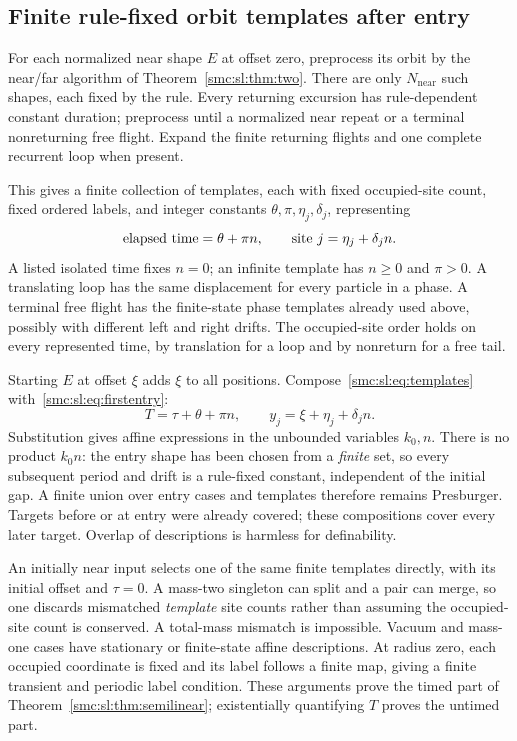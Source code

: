 \documentclass[11pt,letterpaper]{article}
\numberwithin{equation}{section}
\theoremstyle{definition}
\theoremstyle{remark}
\begin{document}
\subsection{Finite rule-fixed orbit templates after entry}
For each normalized near shape $E$ at offset zero, preprocess its orbit by the near/far algorithm of Theorem~\ref{smc:sl:thm:two}. There are only $N_{\mathrm{near}}$ such shapes, each fixed by the rule. Every returning excursion has rule-dependent constant duration; preprocess until a normalized near repeat or a terminal nonreturning free flight. Expand the finite returning flights and one complete recurrent loop when present.

This gives a finite collection of templates, each with fixed occupied-site count, fixed ordered labels, and integer constants $\theta,\pi,\eta_j,\delta_j$, representing
\begin{equation}\label{smc:sl:eq:templates}
 \hbox{elapsed time}=\theta+\pi n,\qquad
 \hbox{site }j=\eta_j+\delta_j n.
\end{equation}
A listed isolated time fixes $n=0$; an infinite template has $n\ge0$ and $\pi>0$. A translating loop has the same displacement for every particle in a phase. A terminal free flight has the finite-state phase templates already used above, possibly with different left and right drifts. The occupied-site order holds on every represented time, by translation for a loop and by nonreturn for a free tail.

Starting $E$ at offset $\xi$ adds $\xi$ to all positions. Compose~\eqref{smc:sl:eq:templates} with~\eqref{smc:sl:eq:firstentry}:
\[
 T=\tau+\theta+\pi n,\qquad
 y_j=\xi+\eta_j+\delta_j n.
\]
Substitution gives affine expressions in the unbounded variables $k_0,n$. There is no product $k_0n$: the entry shape has been chosen from a \emph{finite} set, so every subsequent period and drift is a rule-fixed constant, independent of the initial gap. A finite union over entry cases and templates therefore remains Presburger. Targets before or at entry were already covered; these compositions cover every later target. Overlap of descriptions is harmless for definability.

An initially near input selects one of the same finite templates directly, with its initial offset and $\tau=0$. A mass-two singleton can split and a pair can merge, so one discards mismatched \emph{template} site counts rather than assuming the occupied-site count is conserved. A total-mass mismatch is impossible. Vacuum and mass-one cases have stationary or finite-state affine descriptions. At radius zero, each occupied coordinate is fixed and its label follows a finite map, giving a finite transient and periodic label condition. These arguments prove the timed part of Theorem~\ref{smc:sl:thm:semilinear}; existentially quantifying $T$ proves the untimed part.
\end{document}
